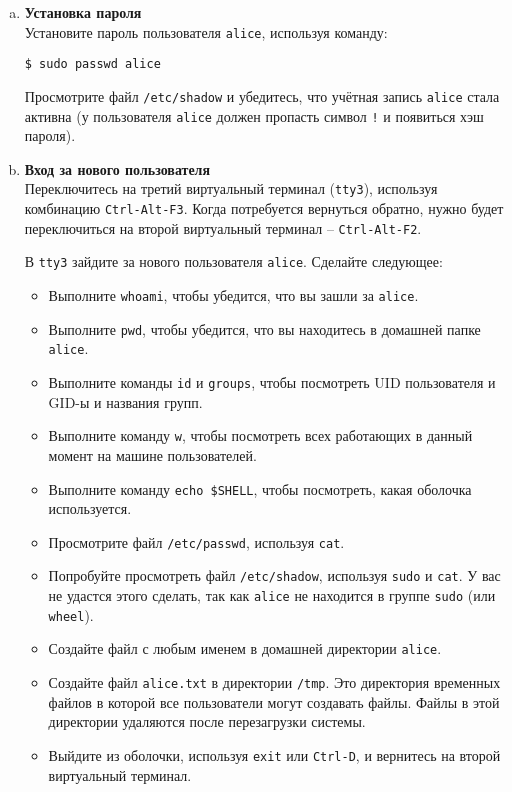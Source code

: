 \documentclass{article}
\begin{document}
\begin{enumerate}[a.]
\item \textbf{Установка пароля}\\
Установите пароль пользователя \texttt{alice}, используя команду:
\begin{lstlisting}
$ sudo passwd alice
\end{lstlisting}
Просмотрите файл \texttt{/etc/shadow} и убедитесь, что учётная запись \texttt{alice} стала активна (у пользователя \texttt{alice} должен пропасть символ \texttt{!} и появиться хэш пароля).

\item \textbf{Вход за нового пользователя}\\
Переключитесь на третий виртуальный терминал (\texttt{tty3}), используя комбинацию \texttt{Ctrl-Alt-F3}. Когда потребуется вернуться обратно, нужно будет переключиться на второй виртуальный терминал -- \texttt{Ctrl-Alt-F2}.

В \texttt{tty3} зайдите за нового пользователя \texttt{alice}. Сделайте следующее:
\begin{itemize}
\item Выполните \texttt{whoami}, чтобы убедится, что вы зашли за \texttt{alice}.
\item Выполните \texttt{pwd}, чтобы убедится, что вы находитесь в домашней папке \texttt{alice}.
\item Выполните команды \texttt{id} и \texttt{groups}, чтобы посмотреть UID пользователя и GID-ы и названия групп.
\item Выполните команду \texttt{w}, чтобы посмотреть всех работающих в данный момент на машине пользователей.
\item Выполните команду \texttt{echo \$SHELL}, чтобы посмотреть, какая оболочка используется.
\item Просмотрите файл \texttt{/etc/passwd}, используя \texttt{cat}.
\item Попробуйте просмотреть файл \texttt{/etc/shadow}, используя \texttt{sudo} и \texttt{cat}. У вас не удастся этого сделать, так как \texttt{alice} не находится в группе \texttt{sudo} (или \texttt{wheel}).
\item Создайте файл с любым именем в домашней директории \texttt{alice}.
\item Создайте файл \texttt{alice.txt} в директории \texttt{/tmp}. Это директория временных файлов в которой все пользователи могут создавать файлы. Файлы в этой директории удаляются после перезагрузки системы.
\item Выйдите из оболочки, используя \texttt{exit} или \texttt{Ctrl-D}, и вернитесь на второй виртуальный терминал.
\end{itemize}
\end{enumerate}
\end{document}
